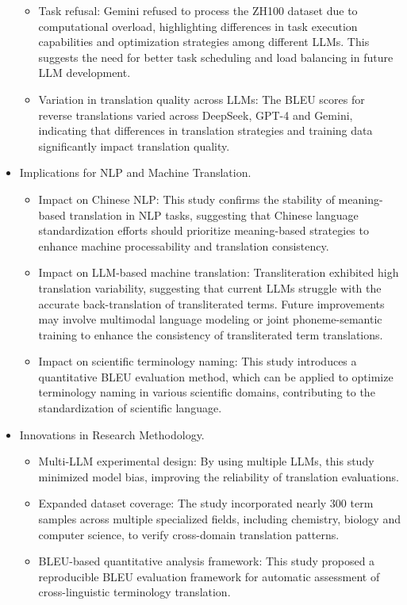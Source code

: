 \documentclass[conference]{IEEEtran}
\begin{document}
\begin{CJK*}{UTF8}{gbsn}
\begin{itemize}
\begin{itemize}
\item Task refusal: Gemini refused to process the ZH100 dataset due to computational overload, highlighting differences in task execution capabilities and optimization strategies among different LLMs. This suggests the need for better task scheduling and load balancing in future LLM development.
\item Variation in translation quality across LLMs: The BLEU scores for reverse translations varied across DeepSeek, GPT-4 and Gemini, indicating that differences in translation strategies and training data significantly impact translation quality.
\end{itemize}
\item Implications for NLP and Machine Translation.
\begin{itemize}
\item Impact on Chinese NLP: This study confirms the stability of meaning-based translation in NLP tasks, suggesting that Chinese language standardization efforts should prioritize meaning-based strategies to enhance machine processability and translation consistency.
\item Impact on LLM-based machine translation: Transliteration exhibited high translation variability, suggesting that current LLMs struggle with the accurate back-translation of transliterated terms. Future improvements may involve multimodal language modeling or joint phoneme-semantic training to enhance the consistency of transliterated term translations.
\item Impact on scientific terminology naming: This study introduces a quantitative BLEU evaluation method, which can be applied to optimize terminology naming in various scientific domains, contributing to the standardization of scientific language.
\end{itemize}
\item Innovations in Research Methodology.
\begin{itemize}
    \item Multi-LLM experimental design: By using multiple LLMs, this study minimized model bias, improving the reliability of translation evaluations.
    \item Expanded dataset coverage: The study incorporated nearly 300 term samples across multiple specialized fields, including chemistry, biology and computer science, to verify cross-domain translation patterns.
    \item BLEU-based quantitative analysis framework: This study proposed a reproducible BLEU evaluation framework for automatic assessment of cross-linguistic terminology translation.

\end{itemize}
\end{itemize}
\end{CJK*}
\end{document}
